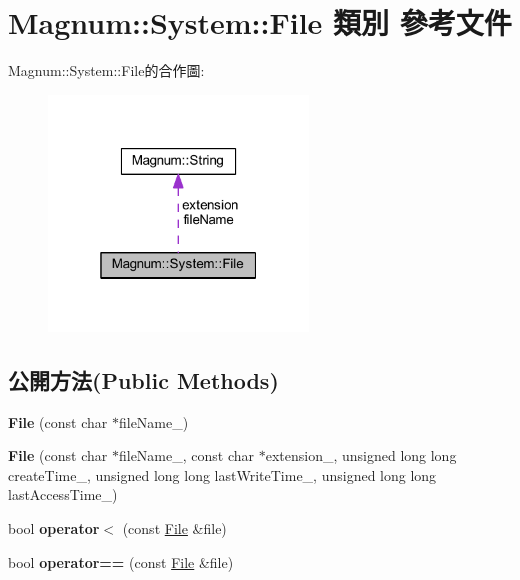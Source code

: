 \hypertarget{class_magnum_1_1_system_1_1_file}{}\section{Magnum\+:\+:System\+:\+:File 類別 參考文件}
\label{class_magnum_1_1_system_1_1_file}


Magnum\+:\+:System\+:\+:File的合作圖\+:\nopagebreak
\begin{figure}[H]
\begin{center}
\leavevmode
\includegraphics[width=196pt]{class_magnum_1_1_system_1_1_file__coll__graph}
\end{center}
\end{figure}
\subsection*{公開方法(Public Methods)}
\begin{DoxyCompactItemize}
\item 
{\bfseries File} (const char $\ast$file\+Name\+\_\+)\hypertarget{class_magnum_1_1_system_1_1_file_a5abd7968cb68e8e166085bb784d14dab}{}\label{class_magnum_1_1_system_1_1_file_a5abd7968cb68e8e166085bb784d14dab}

\item 
{\bfseries File} (const char $\ast$file\+Name\+\_\+, const char $\ast$extension\+\_\+, unsigned long long create\+Time\+\_\+, unsigned long long last\+Write\+Time\+\_\+, unsigned long long last\+Access\+Time\+\_\+)\hypertarget{class_magnum_1_1_system_1_1_file_a786f7939c5b187f4995cfbd23e2a47d2}{}\label{class_magnum_1_1_system_1_1_file_a786f7939c5b187f4995cfbd23e2a47d2}

\item 
bool {\bfseries operator$<$} (const \hyperlink{class_magnum_1_1_system_1_1_file}{File} \&file)\hypertarget{class_magnum_1_1_system_1_1_file_a6c74bdfd3005727200c150082fb71afe}{}\label{class_magnum_1_1_system_1_1_file_a6c74bdfd3005727200c150082fb71afe}

\item 
bool {\bfseries operator==} (const \hyperlink{class_magnum_1_1_system_1_1_file}{File} \&file)\hypertarget{class_magnum_1_1_system_1_1_file_a841f8d08d368ba030de9d74c598a3c28}{}\label{class_magnum_1_1_system_1_1_file_a841f8d08d368ba030de9d74c598a3c28}

\end{DoxyCompactItemize}
